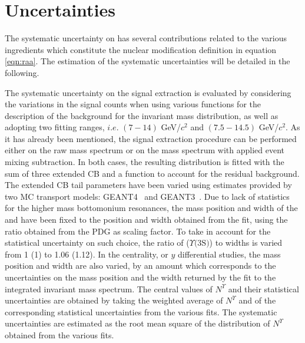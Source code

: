 \section{Uncertainties}\label{subsec:syst_uncert}

The systematic uncertainty on \raa has several contributions related to the various ingredients which constitute the nuclear modification definition in equation \ref{eqn:raa}.
The estimation of the systematic uncertainties will be detailed in the following.

The systematic uncertainty on the signal extraction is evaluated by considering the variations in the signal counts when using various functions for the description of the background for the invariant mass distribution, as well as adopting two fitting ranges, $i.e.$ $(7-14)$ GeV/$c^2$ and $(7.5-14.5)$ GeV/$c^2$.
As it has already been mentioned, the signal extraction procedure can be performed either on the raw mass spectrum or on the mass spectrum with applied event mixing subtraction.
In both cases, the resulting distribution is fitted with the sum of three extended CB and a function to account for the residual background.
The extended CB tail parameters have been varied using estimates provided by two MC transport models: GEANT4~\cite{Agostinelli:2002hh} and GEANT3~\cite{Brun:1082634}. 
Due to lack of statistics for the higher mass bottomonium resonances, the mass position and width of the \upsiss and \upsisss have been fixed to the \upsis position and width obtained from the fit, using the ratio obtained from the PDG as scaling factor.
To take in account for the statistical uncertainty on such choice, the ratio of \upsiss ($\Upsilon\text{(3S)}$) to \upsis widths is varied from 1 (1) to 1.06 (1.12).
In the centrality, \pt or $y$ differential studies, the mass position and width are also varied, by an amount which corresponds to the uncertainties on the mass position and the width returned by the fit to the integrated invariant mass spectrum. 
The central values of $N^{\Upsilon}$ and their statistical uncertainties are obtained by taking the weighted average of $N^{\Upsilon}$ and of the corresponding statistical uncertainties from the various fits.
The systematic uncertainties are estimated as the root mean square of the distribution of $N^{\Upsilon}$ obtained from the various fits.

